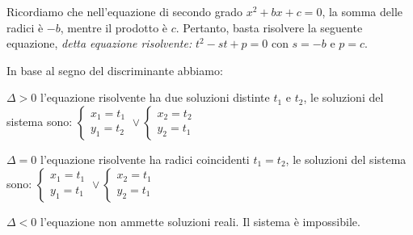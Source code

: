 Ricordiamo che nell'equazione di secondo grado \(x^2+bx+c=0\), la somma delle radici è \(-b\), mentre il prodotto è \(c\). Pertanto, basta risolvere la seguente equazione, \emph{detta equazione risolvente: } \(t^2-st+p=0\) con \(s=-b\) e \(p=c\).

In base al segno del discriminante abbiamo:
\begin{itemize*}
\item \(\Delta >0\) l'equazione risolvente ha due soluzioni distinte \( t_1 \) e \( t_2 \), le soluzioni del sistema sono: \(\left\{\begin{array}{l}{x_1=t_1}\\{y_1=t_2}\end{array}\right.\vee \left\{\begin{array}{l}{x_2=t_2}\\{y_2=t_1}\end{array}\right.\)
\item \(\Delta =0\) l'equazione risolvente ha radici coincidenti \(t_1=t_2\), le soluzioni del sistema sono: \(\left\{\begin{array}{l}{x_1=t_1}\\{y_1=t_1}\end{array}\right.\vee \left\{\begin{array}{l}{x_2=t_1}\\{y_2=t_1}\end{array}\right.\)
\item \(\Delta <0\) l'equazione non ammette soluzioni reali. Il sistema è impossibile.
\end{itemize*}

